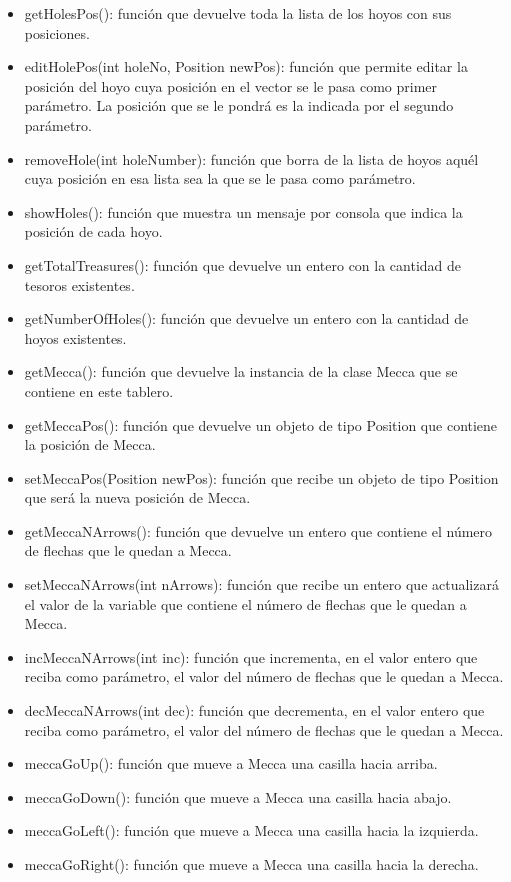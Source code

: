 \documentclass[a4paper,12pt,twoside,openright]{report}
\begin{document}
\begin{itemize}
   \item getHolesPos(): función que devuelve toda la lista de los hoyos con sus posiciones.
   \item editHolePos(int holeNo, Position newPos): función que permite editar la posición del hoyo cuya posición en el vector se le pasa 
   como primer parámetro. La posición que se le pondrá es la indicada por el segundo parámetro.
   \item removeHole(int holeNumber): función que borra de la lista de hoyos aquél cuya posición en esa lista sea la que 
   se le pasa como parámetro.
   \item showHoles(): función que muestra un mensaje por consola que indica la posición de cada hoyo.
   \item getTotalTreasures(): función que devuelve un entero con la cantidad de tesoros existentes.
   \item getNumberOfHoles(): función que devuelve un entero con la cantidad de hoyos existentes.
   \item getMecca(): función que devuelve la instancia de la clase Mecca que se contiene en este tablero.
   \item getMeccaPos(): función que devuelve un objeto de tipo Position que contiene la posición de Mecca.
   \item setMeccaPos(Position newPos): función que recibe un objeto de tipo Position que será la nueva posición de Mecca.
   \item getMeccaNArrows(): función que devuelve un entero que contiene el número de flechas que le quedan a Mecca.
   \item setMeccaNArrows(int nArrows): función que recibe un entero que actualizará el valor de la variable que contiene el número de flechas que le quedan a Mecca.
   \item incMeccaNArrows(int inc): función que incrementa, en el valor entero que reciba como parámetro, el valor del número de flechas que le quedan a Mecca.
   \item decMeccaNArrows(int dec): función que decrementa, en el valor entero que reciba como parámetro, el valor del número de flechas que le quedan a Mecca.
   \item meccaGoUp(): función que mueve a Mecca una casilla hacia arriba.
   \item meccaGoDown(): función que mueve a Mecca una casilla hacia abajo.
   \item meccaGoLeft(): función que mueve a Mecca una casilla hacia la izquierda.
   \item meccaGoRight(): función que mueve a Mecca una casilla hacia la derecha.

\end{itemize}
\end{document}
